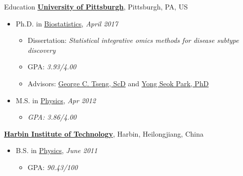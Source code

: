 \documentclass{resume} %
\begin{document}
\pagestyle{plain}


\begin{rSection}{Education}
\href{http://www.pitt.edu}{\textbf{University of Pittsburgh}}, \hfill{Pittsburgh, PA, US}
\begin{itemize}[noitemsep,topsep=0pt]
\item Ph.D. in
        \href{http://www.publichealth.pitt.edu/biostatistics}
             {Biostatistics},
              \hfill{\em April 2017}
	\begin{itemize}
        \item Dissertation:  \emph{Statistical integrative omics methods for disease subtype discovery}
        \item GPA: \emph{3.93/4.00}
        \item Advisors:
              \href{http://www.pitt.edu/~ctseng/}
                   {George C. Tseng, ScD} and
              \href{http://www.publichealth.pitt.edu/home/directory/yong-seok-park/}
                   {Yong Seok Park, PhD}
	\end{itemize}
	\item M.S. in
        \href{http://www.physicsandastronomy.pitt.edu}
             {Physics}, \hfill {\em Apr 2012}              
	\begin{itemize}
	\item {\emph{GPA: 3.86/4.00}}
	\end{itemize}
\end{itemize}

\href{http://www.hit.edu.cn} {\textbf{Harbin Institute of Technology}},
\hfill{Harbin, Heilongjiang, China}
\begin{itemize}[noitemsep,topsep=0pt]
\item B.S. in
        \href{http://physics.hit.edu.cn/}
             {Physics}, \hfill {\em June 2011} 
        \begin{itemize}
        \item GPA: \emph{90.43/100}
        \end{itemize}

\end{itemize}
\end{rSection}
\end{document}
